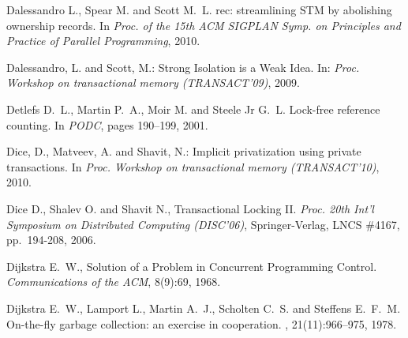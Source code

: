\begin{thebibliography}{99}
{
Dalessandro L., Spear M. and Scott M.~L.
rec: streamlining {STM} by abolishing ownership records.
\newblock In {\em Proc. of the 15th ACM SIGPLAN Symp. on Principles and
  Practice of Parallel Programming}, 2010.





Dalessandro, L. and Scott, M.:
Strong Isolation is a Weak Idea. 
In: {\it Proc. Workshop on transactional memory (TRANSACT'09)}, 2009.




Detlefs D.~L., Martin P.~A., Moir M. and Steele Jr G.~L.
\newblock Lock-free reference counting.
\newblock In {\em PODC}, pages 190--199, 2001.


Dice, D., Matveev, A. and  Shavit, N.:
\newblock Implicit privatization using private transactions. 
\newblock In {\em Proc. Workshop on transactional memory (TRANSACT'10)}, 2010.


Dice D., Shalev O. and Shavit N.,
Transactional Locking II.
{\em Proc. 20th Int'l Symposium on Distributed Computing (DISC'06)},
Springer-Verlag, LNCS \#4167, pp.~194-208, 2006.

% 
% 
% 
% 




Dijkstra E.~W., 
Solution of a Problem in Concurrent Programming Control.
{\it  Communications of the  ACM}, 8(9):69, 1968.

Dijkstra E.~W., Lamport L., Martin A.~J., Scholten C.~S. and 
  Steffens E.~F.~M.
\newblock On-the-fly garbage collection: an exercise in cooperation.
, 21(11):966--975, 1978.

}
\end{thebibliography}
